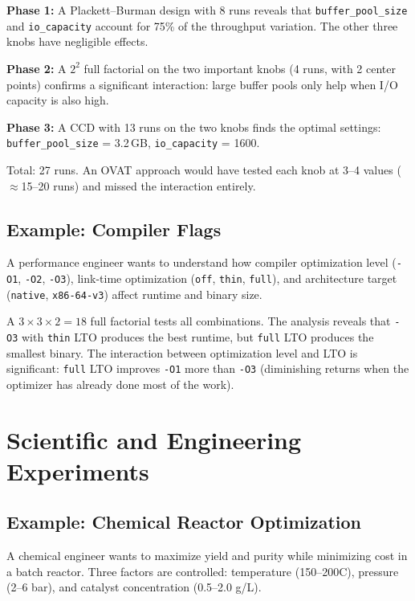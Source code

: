 \documentclass[11pt]{book}
\begin{document}
\textbf{Phase 1:} A Plackett--Burman design with 8 runs reveals that
\texttt{buffer\_pool\_size} and \texttt{io\_capacity} account for 75\% of the
throughput variation. The other three knobs have negligible effects.

\textbf{Phase 2:} A $2^2$ full factorial on the two important knobs (4 runs,
with 2 center points) confirms a significant interaction: large buffer pools
only help when I/O capacity is also high.

\textbf{Phase 3:} A CCD with 13 runs on the two knobs finds the optimal
settings: \texttt{buffer\_pool\_size} = 3.2\,GB, \texttt{io\_capacity} = 1600.

Total: 27 runs. An OVAT approach would have tested each knob at 3--4 values
($\approx$15--20 runs) and missed the interaction entirely.

\subsection{Example: Compiler Flags}

A performance engineer wants to understand how compiler optimization level
(\texttt{-O1}, \texttt{-O2}, \texttt{-O3}), link-time optimization
(\texttt{off}, \texttt{thin}, \texttt{full}), and architecture target
(\texttt{native}, \texttt{x86-64-v3}) affect runtime and binary size.

A $3 \times 3 \times 2 = 18$ full factorial tests all combinations. The analysis
reveals that \texttt{-O3} with \texttt{thin} LTO produces the best runtime, but
\texttt{full} LTO produces the smallest binary. The interaction between
optimization level and LTO is significant: \texttt{full} LTO improves
\texttt{-O1} more than \texttt{-O3} (diminishing returns when the optimizer has
already done most of the work).

\section{Scientific and Engineering Experiments}

\subsection{Example: Chemical Reactor Optimization}

A chemical engineer wants to maximize yield and purity while minimizing cost in a
batch reactor. Three factors are controlled: temperature (150--200\textdegree C),
pressure (2--6 bar), and catalyst concentration (0.5--2.0 g/L).
\end{document}
